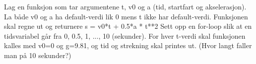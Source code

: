 %
%
Lag en funksjon som tar argumentene t, v0 og a (tid, startfart og akselerasjon). La både v0 og a ha default-verdi lik 0 mens t ikke har default-verdi. Funksjonen skal regne ut og returnere  s = v0*t + 0.5*a * t**2 Sett opp en for-loop slik at en tidsvariabel går fra 0, 0.5, 1, ..., 10 (sekunder). For hver t-verdi skal funksjonen kalles med v0=0 og g=9.81, og tid og strekning skal printes ut. (Hvor langt faller man på 10 sekunder?)
